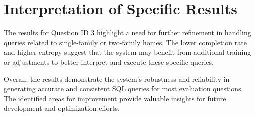 \section{Interpretation of Specific Results}
The results for Question ID 3 highlight a need for further refinement in handling queries related to single-family or two-family homes. The lower completion rate and higher entropy suggest that the system may benefit from additional training or adjustments to better interpret and execute these specific queries.

Overall, the results demonstrate the system's robustness and reliability in generating accurate and consistent SQL queries for most evaluation questions. The identified areas for improvement provide valuable insights for future development and optimization efforts.


